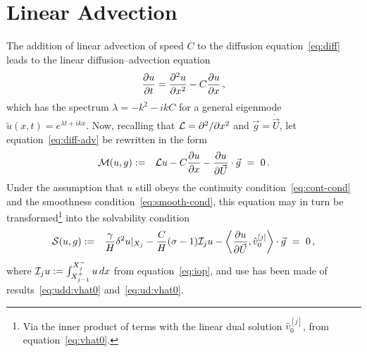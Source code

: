 \documentclass[12pt,a5paper]{article}
\begin{document}
\section{Linear Advection}
The addition of linear advection of speed $C$ to the diffusion equation~\eqref{eq:diff} leads to the
linear diffusion--advection equation
\begin{eqnarray}
	\D tu = \DD xu - C\D xu\,,
	\label{eq:diff-adv}
\end{eqnarray}
which has the spectrum $\lambda=-k^2-ikC$ for a general eigenmode $\tilde{u}(x,t)=e^{\lambda t+ikx}$.
Now, recalling that ${\cal L}=\DD{x}{}$ and $\vec{g}=\dot{\vec{U}}$, let equation~\eqref{eq:diff-adv} be rewritten in the form
\begin{eqnarray}
{\cal M}(u,g) & := & {\cal L}u-C\D xu-\D{\vec{U}}{u}\cdot\vec{g}~=~0\,.
\label{eq:Mug}
\end{eqnarray}
Under the assumption that $u$ still obeys the continuity condition~\eqref{eq:cont-cond} and the smoothness condition~\eqref{eq:smooth-cond}, this equation may in turn be transformed\footnote{Via the inner product of terms with the
linear dual solution $\hat{v}_0^{[j]}$, from equation~\eqref{eq:vhat0}.} into the solvability condition
\begin{eqnarray}
       {\cal S}(u,g) & := & 
          \frac{\gamma}{H}\delta^2u|_{X_j} - \frac{C}{H}(\sigma-1){\cal I}_j u
	-\left\langle\D {\vec U}u,\hat{v}_0^{[j]}\right\rangle\cdot\vec{g}~=~0 \,,
\label{eq:Sug}
\end{eqnarray}
where ${\cal I}_j u := \int_{X^+_{j-1}}^{X^-_j}u\,dx$
from equation~\eqref{eq:iop}, and
use has been made of results~\eqref{eq:udd:vhat0} and~\eqref{eq:ud:vhat0}.
\end{document}
